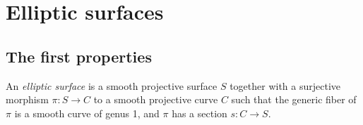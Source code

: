 \section{Elliptic surfaces}


\subsection{The first properties}

    \begin{definition}\label{def:elliptic_surface}
        An \emph{elliptic surface} is a smooth projective surface \(S\) together with a surjective morphism \(\pi:S\to C\) to a smooth projective curve \(C\) such that the generic fiber of \(\pi\) is a smooth curve of genus 1, and \(\pi\) has a section \(s:C\to S\).
    \end{definition}
